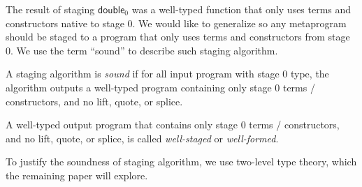 

The result of staging $\mathsf{double}_0$ was a well-typed function that only uses terms and constructors native to stage 0. We would like to generalize so any metaprogram should be staged to a program that only uses terms and constructors from stage 0. We use the term ``sound'' to describe such staging algorithm.

\begin{definition}
    A staging algorithm is \emph{sound} if for all input program with stage 0 type, the algorithm outputs a well-typed program containing only stage 0 terms / constructors, and no lift, quote, or splice.
    
    A well-typed output program that contains only stage 0 terms / constructors, and no lift, quote, or splice, is called \emph{well-staged} or \emph{well-formed}.
\end{definition} 
To justify the soundness of staging algorithm, we use two-level type theory, which the remaining paper will explore.


